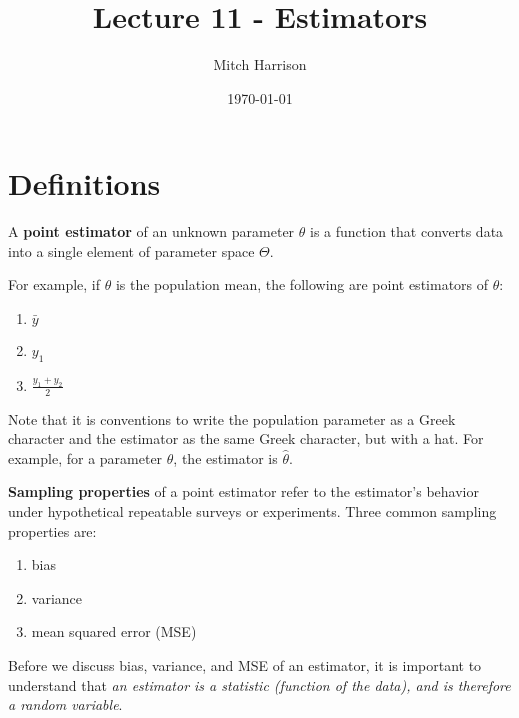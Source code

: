 \documentclass[titlepage, 12pt, leqno]{article}
\title{\Huge{Lecture 11 - Estimators}}
\author{\large{Mitch Harrison}}
\date{\today}
\begin{document}
\setlength{\parskip}{1\baselineskip}
\setlength{\parindent}{15pt}
\maketitle
\tableofcontents
\newpage


\section{Definitions}

\begin{definition}
    A \textbf{point estimator} of an unknown parameter $\theta$ is a function
    that converts data into a single element of parameter space $\Theta$.

    For example, if $\theta$ is the population mean, the following are point
    estimators of $\theta$:
    \begin{enumerate}
        \item $\bar y$
        \item $y_{1}$
        \item $\frac{y_{1}+y_{2}}{2}$
    \end{enumerate}
\end{definition}

Note that it is conventions to write the population parameter as a Greek 
character and the estimator as the same Greek character, but with a hat.
For example, for a parameter $\theta$, the estimator is $\hat \theta$.

\begin{definition}
    \textbf{Sampling properties} of a point estimator refer to the estimator's
    behavior under hypothetical repeatable surveys or experiments. Three common
    sampling properties are:
    \begin{enumerate}
        \item bias
        \item variance
        \item mean squared error (MSE)
    \end{enumerate}
\end{definition}

\begin{note}
    Before we discuss bias, variance, and MSE of an estimator, it is important 
    to understand that \textit{an estimator is a statistic (function of the 
    data), and is therefore a random variable}.
\end{note}
\end{document}
